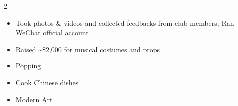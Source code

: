 \documentclass[10pt,a4paper,ragged2e,withhyper]{altacv}
\begin{document}
\begin{paracol}{2}
\begin{itemize}
    \item Took photos \& videos and collected feedbacks from club members; Ran
    WeChat official account

    \item Raised \~{}\$2,000 for musical costumes and props
\end{itemize}
\divider{}





\small
\begin{itemize}
    \item Popping

    \item Cook Chinese dishes

    \item Modern Art
\end{itemize}
\medskip


\end{paracol}
\end{document}
